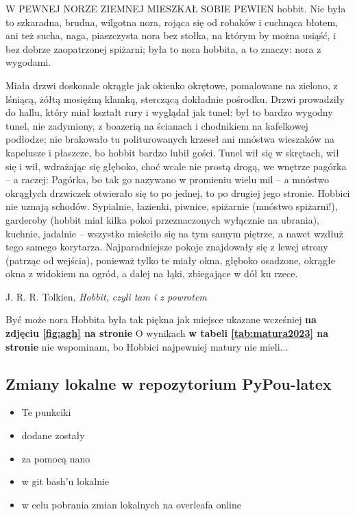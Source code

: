 \par
W PEWNEJ NORZE ZIEMNEJ MIESZKAŁ SOBIE PEWIEN hobbit. Nie była to szkaradna, brudna, wilgotna nora, rojąca się od robaków i cuchnąca błotem, ani też sucha, naga, piaszczysta nora bez stołka, na którym by można usiąść, i bez dobrze zaopatrzonej spiżarni; była to nora hobbita, a to znaczy: nora z wygodami.\par Miała drzwi doskonale okrągłe jak okienko okrętowe, pomalowane na zielono, z lśniącą, żółtą mosiężną klamką, sterczącą dokładnie pośrodku. Drzwi prowadziły do hallu, który miał kształt rury i wyglądał jak tunel: był to bardzo wygodny tunel, nie zadymiony, z boazerią na ścianach i chodnikiem na kafelkowej podłodze; nie brakowało tu politurowanych krzeseł ani mnóstwa wieszaków na kapelusze i płaszcze, bo hobbit bardzo lubił gości. Tunel wił się w skrętach, wił się i wił, wdrażając się głęboko, choć wcale nie prostą drogą, we wnętrze pagórka – a raczej: Pagórka, bo tak go nazywano w promieniu wielu mil – a mnóstwo okrągłych drzwiczek otwierało się to po jednej, to po drugiej jego stronie. Hobbici nie uznają schodów. Sypialnie, łazienki, piwnice, spiżarnie (mnóstwo spiżarni!), garderoby (hobbit miał kilka pokoi przeznaczonych wyłącznie na ubrania), kuchnie, jadalnie – wszystko mieściło się na tym samym piętrze, a nawet wzdłuż tego samego korytarza. Najparadniejsze pokoje znajdowały się z lewej strony (patrząc od wejścia), ponieważ tylko te miały okna, głęboko osadzone, okrągłe okna z widokiem na ogród, a dalej na łąki, zbiegające w dół ku rzece.\par
\begin{flushright}
J. R. R. Tolkien, \textit{Hobbit, czyli tam i z powrotem}
\end{flushright}
\par
\begingroup
    \centering
    Być może nora Hobbita była tak piękna jak miejsce ukazane wcześniej \textbf{na zdjęciu \ref{fig:agh} na stronie \pageref{fig:agh}} \Huge{\smiley{}} %
    \normalsize
    O wynikach \textbf{w tabeli \ref{tab:matura2023} na stronie \pageref{tab:matura2023}} nie wspominam, bo Hobbici najpewniej matury nie mieli... \Huge{\frownie{}}
\endgroup
\subsection{Zmiany lokalne w repozytorium PyPou-latex}
\begin{itemize}
	\item Te punkciki
	\item dodane zostały
	\item za pomocą nano
	\item w git bash'u lokalnie
	\item w celu pobrania zmian lokalnych na overleafa online 
\end{itemize}
\newpage
